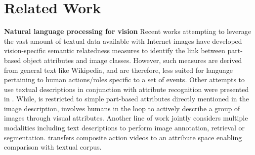 \documentclass[10pt,twocolumn,letterpaper]{article}
\begin{document}

\section{Related Work}
\noindent \textbf{Natural language processing for vision} 
Recent works attempting to leverage the vast amount of textual data available with Internet images have 
developed vision-specific semantic relatedness measures \cite{Rohrbach_CVPR10, Rohrbach_ECCV10} 
to identify the link between part-based object attributes and image classes. 
However, such measures are derived from general text like Wikipedia, 
and are therefore, less suited for language pertaining to human actions/roles specific to a set of events. 
Other attempts to use textual descriptions in conjunction with attribute recognition were 
presented in \cite{Berg_ECCV10, Parikh_CVPR11}. 
While, \cite{Berg_ECCV10} is restricted to simple part-based attributes directly mentioned in the image description,
\cite{Parikh_CVPR11} involves humans in the loop to actively describe a group of images through visual attributes. 
Another line of work \cite{Jia_ICCV11, Socher_CVPR10} jointly considers multiple modalities including text descriptions to perform image annotation, retrieval or segmentation. 
\cite{Rohrbach_ECCV12}  transfers composite action videos to an attribute space enabling comparison with textual corpus. %
\end{document}
